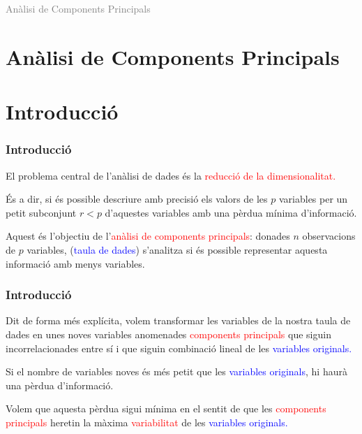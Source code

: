 \documentclass[12pt,t]{beamer}
\title[\red{Matemàtiques II}]{}
\author[]{}
\date{}
\newcommand{\red}[1]{\textcolor{red}{#1}}
\newcommand{\blue}[1]{\textcolor{blue}{#1}}
\newcommand{\gray}[1]{\textcolor{gray}{#1}}
\theoremstyle{plain}
\theoremstyle{definition}
\begin{document}
\beamertemplatedotitem

\lstset{breaklines=true}
\lstset{basicstyle=\ttfamily}
\lstset{extendedchars=true}
\lstset{showstringspaces=false}

\begin{frame}
\vfill
\begin{center}
\gray{\LARGE Anàlisi de Components Principals}
\end{center}
\vfill
\end{frame}
\section{Anàlisi de Components Principals}
\section{Introducció}
\begin{frame}
\frametitle{Introducció}

El problema central de l'anàlisi de dades és la \red{reducció de la dimensionalitat.}
\medskip

És a dir, si és possible descriure amb precisió els valors de les $p$ variables per un petit subconjunt $r <p$ 
d'aquestes variables amb una pèrdua mínima d'informació.
\bigskip

Aquest és l'objectiu de l'\red{anàlisi de components principals}: donades $n$ observacions de $p$ variables, 
(\blue{taula de dades}) s'analitza si és possible representar aquesta informació amb menys variables.


\end{frame}

\begin{frame}
\frametitle{Introducció}
Dit de forma més explícita, volem transformar les variables de la nostra taula de dades en unes noves variables 
anomenades \red{components principals} que siguin incorrelacionades entre sí i que siguin combinació lineal de les 
\blue{variables originals.}
\medskip

Si el nombre de variables noves és més petit que les \blue{variables originals}, hi haurà una pèrdua d'informació. 
\medskip

Volem que aquesta pèrdua sigui mínima en el sentit de que les \red{components principals} heretin la màxima 
\red{variabilitat} de les \blue{variables originals.}
\end{frame}
\end{document}

